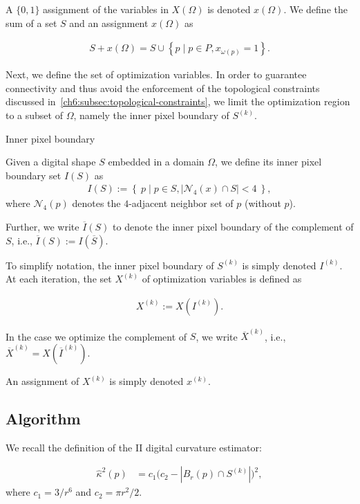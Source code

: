 A $\{0,1\}$ assignment of the variables in $X(\Omega)$ is denoted $x(\Omega)$. We define the sum of a set $S$ and an assignment $x(\Omega)$ as

\begin{align*}
	S + x(\Omega) = S \cup \left\{ p \; | \; p \in P, x_{\omega(p)}=1 \right\}.
\end{align*}

Next, we define the set of optimization variables. In order to guarantee connectivity and thus avoid the enforcement of the topological constraints discussed in~\cref{ch6:subsec:topological-constraints}, we limit the optimization region to a subset of $\Omega$, namely the inner pixel boundary of  $S^{(k)}$.

\begin{definition}{Inner pixel boundary}

Given a digital shape $S$ embedded in a domain $\Omega$, we define its inner pixel boundary set $I(S)$ as
\begin{align*}
	I(S) := \left\{ \: p \; | \; p \in S, |\mathcal{N}_4(x) \cap S|<4 \: \right\},
\end{align*}
where $\mathcal{N}_4(p)$ denotes the $4$-adjacent neighbor set of $p$ (without $p$). 
\end{definition}

Further, we write $\overline{I}(S)$ to denote the inner pixel boundary of the complement of $S$, i.e., $\overline{I}(S) := I(\overline{S})$.

To simplify notation, the inner pixel boundary of $S^{(k)}$ is simply denoted $I^{(k)}$. At each iteration, the set $X^{(k)}$ of optimization variables is defined as

\begin{align*}
	X^{(k)} := X(I^{(k)}).
\end{align*}

In the case we optimize the complement of $S$, we write $\overline{X}^{(k)}$, i.e., $\overline{X}^{(k)} = X(\overline{I}^{(k)})$.

An assignment of $X^{(k)}$ is simply denoted $x^{(k)}$. 


\subsection{Algorithm}
\label{ch7:subsec:algorithm}

We recall the definition of the II digital curvature estimator:

\begin{align}
	\hat{\kappa}^2(p) &= c_1\Big( c_2 - | B_r(p) \cap S^{(k)} | \Big)^2, 
	\label{eq:curvature-estimator-pixels}
\end{align}
where $c_1=3/r^6$ and $c_2=\pi r^2/2$. 

